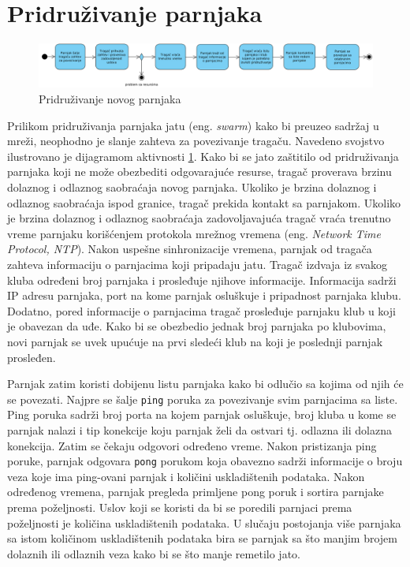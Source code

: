 \documentclass[12pt,oneside]{memoir}
\begin{document}
\section{Pridruživanje parnjaka}
\label{Kikkar.2}

\begin{figure}[!ht]
  \centering
  \includegraphics[width=1.05\textwidth]{slike/pridruzivanje.jpg}
  \caption{Pridruživanje novog parnjaka}
  \label{fig:pridruzivanje}
\end{figure}
\par


Prilikom pridruživanja parnjaka jatu (eng. \textit{swarm}) kako bi preuzeo sadržaj u mreži, neophodno je slanje zahteva za povezivanje tragaču. Navedeno svojstvo ilustrovano je dijagramom aktivnosti \ref{fig:pridruzivanje}. Kako bi se jato zaštitilo od pridruživanja parnjaka koji ne može obezbediti odgovarajuće resurse, tragač proverava brzinu dolaznog i odlaznog saobraćaja novog parnjaka. Ukoliko je brzina dolaznog i odlaznog saobraćaja ispod granice, tragač prekida kontakt sa parnjakom. Ukoliko je brzina dolaznog i odlaznog saobraćaja zadovoljavajuća tragač vraća trenutno vreme parnjaku korišćenjem protokola mrežnog vremena (eng. \textit{Network Time Protocol, NTP}). Nakon uspešne sinhronizacije vremena, parnjak od tragača zahteva informaciju o parnjacima koji pripadaju jatu. Tragač izdvaja iz svakog kluba određeni broj parnjaka i prosleđuje njihove informacije. Informacija sadrži IP adresu parnjaka, port na kome parnjak osluškuje i pripadnost parnjaka klubu.  Dodatno, pored informacije o parnjacima tragač prosleđuje parnjaku klub u koji je obavezan da uđe. Kako bi se obezbedio jednak broj parnjaka po klubovima, novi parnjak se uvek upućuje na prvi sledeći klub na koji je poslednji parnjak prosleđen. 


Parnjak zatim koristi dobijenu listu parnjaka kako bi odlučio sa kojima od njih će se povezati. Najpre se šalje \texttt{ping} poruka za povezivanje svim parnjacima sa liste. Ping poruka sadrži broj porta na kojem parnjak osluškuje, broj kluba u kome se parnjak nalazi i tip konekcije koju parnjak želi da ostvari tj. odlazna ili dolazna konekcija. Zatim se čekaju odgovori određeno vreme. Nakon pristizanja ping poruke, parnjak odgovara \texttt{pong} porukom koja obavezno sadrži informacije o broju veza koje ima ping-ovani parnjak i količini uskladištenih podataka. Nakon određenog vremena, parnjak pregleda primljene pong poruk i sortira parnjake prema poželjnosti. Uslov koji se koristi da bi se poredili parnjaci prema poželjnosti je količina uskladištenih podataka. U slučaju postojanja više parnjaka sa istom količinom uskladištenih podataka bira se parnjak sa što manjim brojem dolaznih ili odlaznih veza kako bi se što manje remetilo jato.
 
\end{document}
